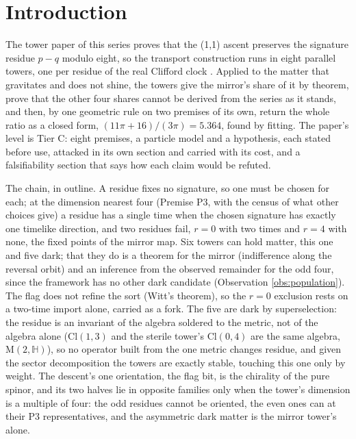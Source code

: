 \documentclass[11pt]{article}
\theoremstyle{definition}
\newcommand{\Cl}{\mathrm{Cl}}
\newcommand{\Mat}{\mathrm{M}}
\let\oldsection\section
\renewcommand{\section}{\clearpage\oldsection}   %
\begin{document}
\newpage
\section{Introduction}\label{sec:intro}

The tower paper of this series proves that the (1,1) ascent preserves the signature residue $p - q$ modulo eight, so the transport construction runs in eight parallel towers, one per residue of the real Clifford clock \cite{ButlerT3}. Applied to the matter that gravitates and does not shine, the towers give the mirror's share of it by theorem, prove that the other four shares cannot be derived from the series as it stands, and then, by one geometric rule on two premises of its own, return the whole ratio as a closed form, $(11\pi + 16)/(3\pi) = 5.364$, found by fitting. The paper's level is Tier C: eight premises, a particle model and a hypothesis, each stated before use, attacked in its own section and carried with its cost, and a falsifiability section that says how each claim would be refuted.

The chain, in outline. A residue fixes no signature, so one must be chosen for each; at the dimension nearest four (Premise P3, with the census of what other choices give) a residue has a single time when the chosen signature has exactly one timelike direction, and two residues fail, $r = 0$ with two times and $r = 4$ with none, the fixed points of the mirror map. Six towers can hold matter, this one and five dark; that they do is a theorem for the mirror (indifference along the reversal orbit) and an inference from the observed remainder for the odd four, since the framework has no other dark candidate (Observation \ref{obs:population}). The flag does not refine the sort (Witt's theorem), so the $r = 0$ exclusion rests on a two-time import alone, carried as a fork. The five are dark by superselection: the residue is an invariant of the algebra soldered to the metric, not of the algebra alone ($\Cl(1,3)$ and the sterile tower's $\Cl(0,4)$ are the same algebra, $\Mat(2, \mathbb{H})$), so no operator built from the one metric changes residue, and given the sector decomposition the towers are exactly stable, touching this one only by weight. The descent's one orientation, the flag bit, is the chirality of the pure spinor, and its two halves lie in opposite families only when the tower's dimension is a multiple of four: the odd residues cannot be oriented, the even ones can at their P3 representatives, and the asymmetric dark matter is the mirror tower's alone.
\end{document}
